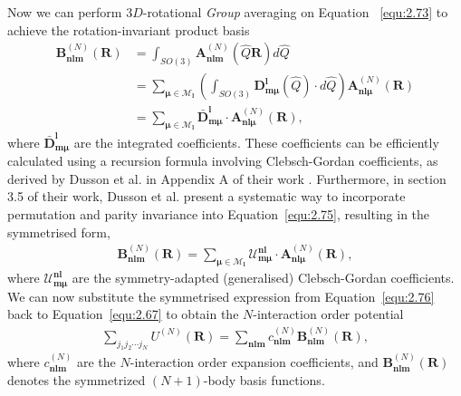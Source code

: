 Now we can perform $3D$-rotational \textit{Group} averaging on Equation ~\eqref{equ:2.73} to achieve the rotation-invariant product basis
\begin{equation}
\label{equ:2.75}
\begin{split}
    \textbf{B}^{(N)}_{\mathbf{nlm}}(\mathbf{R}) &= \int_{SO(3)} \textbf{A}^{(N)}_{\mathbf{nlm}}(\hat{Q}\mathbf{R})d\hat{Q}\\ &
    =\sum_{\boldsymbol{\mu}\in\mathcal{M}_{\textbf{l}}}
    \left(\int_{SO(3)}
\mathbf{D}^{\textbf{l}}_{\textbf{m}\boldsymbol{\mu}}(\hat{Q})\cdot d\hat{Q}
\right)
\textbf{A}^{(N)}_{\mathbf{nl}\boldsymbol{\mu}}(\mathbf{R})\\ &
=\sum_{\boldsymbol{\mu}\in\mathcal{M}_{\textbf{l}}}
\bar{\mathbf{D}}^{\textbf{l}}_{\textbf{m}\boldsymbol{\mu}}\cdot
\textbf{A}^{(N)}_{\mathbf{nl}\boldsymbol{\mu}}(\mathbf{R}),
\end{split}
\end{equation}
where $\bar{\mathbf{D}}^{\textbf{l}}_{\textbf{m}\boldsymbol{\mu}}$ are the integrated coefficients.
These coefficients can be efficiently calculated using a recursion formula involving Clebsch-Gordan coefficients, as derived by Dusson et al. in Appendix A of their work \cite{Dusson2022}. 
Furthermore, in section 3.5 of their work, Dusson et al. present a systematic way to incorporate permutation and parity invariance into Equation~\eqref{equ:2.75}, resulting in the symmetrised form,
\begin{equation}
\label{equ:2.76}
\begin{split}
    \textbf{B}^{(N)}_{\mathbf{nlm}}(\mathbf{R}) 
=\sum_{\boldsymbol{\mu}\in\mathcal{M}_{\textbf{l}}}
\mathcal{U}^{\textbf{nl}}_{\textbf{m}\boldsymbol{\mu}}\cdot
\textbf{A}^{(N)}_{\mathbf{nl}\boldsymbol{\mu}}(\mathbf{R}),
\end{split}
\end{equation}
where $\mathcal{U}^{\textbf{nl}}_{\textbf{m}\boldsymbol{\mu}}$ are the symmetry-adapted (generalised) Clebsch-Gordan coefficients.
We can now substitute the symmetrised expression from Equation~\eqref{equ:2.76} back to Equation~\eqref{equ:2.67} to obtain the $N$-interaction order potential
\begin{equation}
\label{equ:2.77}
\begin{split}
\sum_{{j}_{1}{j}_{2}\cdots{j}_{N}}U^{(N)}(\textbf{R})
=\sum_{\mathbf{nlm}}
c^{(N)}_{\mathbf{nlm}}\textbf{B}^{(N)}_{\mathbf{nlm}}(\mathbf{R}),
\end{split}
\end{equation}
where $c^{(N)}_{\mathbf{nlm}}$ are the $N$-interaction order expansion coefficients, and $\textbf{B}^{(N)}_{\mathbf{nlm}}(\mathbf{R})$ denotes the symmetrized $(N+1)$-body basis functions.
